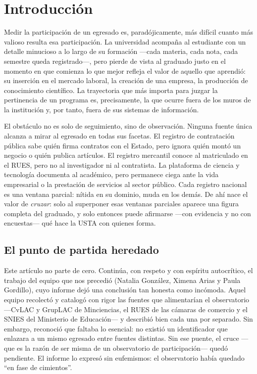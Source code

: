 \section{Introducción}

Medir la participación de un egresado es, paradójicamente, más difícil cuanto más valioso resulta esa participación. La universidad acompaña al estudiante con un detalle minucioso a lo largo de su formación —cada materia, cada nota, cada semestre queda registrado—, pero pierde de vista al graduado justo en el momento en que comienza lo que mejor refleja el valor de aquello que aprendió: su inserción en el mercado laboral, la creación de una empresa, la producción de conocimiento científico. La trayectoria que más importa para juzgar la pertinencia de un programa es, precisamente, la que ocurre fuera de los muros de la institución y, por tanto, fuera de sus sistemas de información.

El obstáculo no es solo de seguimiento, sino de observación. Ninguna fuente única alcanza a mirar al egresado en todas sus facetas. El registro de contratación pública sabe quién firma contratos con el Estado, pero ignora quién montó un negocio o quién publica artículos. El registro mercantil conoce al matriculado en el RUES, pero no al investigador ni al contratista. La plataforma de ciencia y tecnología documenta al académico, pero permanece ciega ante la vida empresarial o la prestación de servicios al sector público. Cada registro nacional es una ventana parcial: nítida en su dominio, muda en los demás. De ahí nace el valor de \emph{cruzar}: solo al superponer esas ventanas parciales aparece una figura completa del graduado, y solo entonces puede afirmarse —con evidencia y no con encuestas— qué hace la USTA con quienes forma.

\subsection{El punto de partida heredado}

Este artículo no parte de cero. Continúa, con respeto y con espíritu autocrítico, el trabajo del equipo que nos precedió (Natalia González, Ximena Arias y Paula Gordillo), cuyo informe dejó una conclusión tan honesta como incómoda. Aquel equipo recolectó y catalogó con rigor las fuentes que alimentarían el observatorio —CvLAC y GrupLAC de Minciencias, el RUES de las cámaras de comercio y el SNIES del Ministerio de Educación— y describió bien cada una por separado. Sin embargo, reconoció que faltaba lo esencial: no existió un identificador que enlazara a un mismo egresado entre fuentes distintas. Sin ese puente, el cruce —que es la razón de ser misma de un observatorio de participación— quedó pendiente. El informe lo expresó sin eufemismos: el observatorio había quedado \enquote{en fase de cimientos}.

